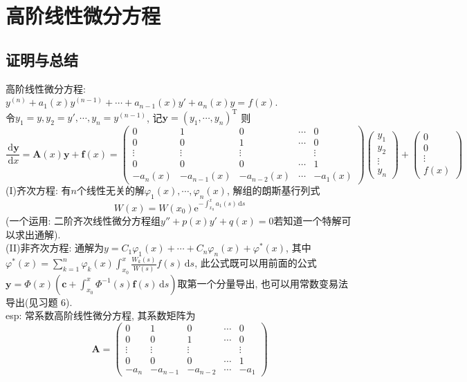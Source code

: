 \documentclass[titlepage,11pt,a4paper,twoside]{report}
\newcommand\diff{\,\mathrm{d}}
\newcommand\e{\mathrm{e}}
\newcommand\bmitPhi{\bm{\varPhi}}
\newcommand\T{\mathrm{T}}
\begin{document}
\section{高阶线性微分方程}
\subsection{证明与总结}
高阶线性微分方程: $y^{(n)}+a_1(x)y^{(n-1)}+\cdots+a_{n-1}(x)y'+a_n(x)y=f(x)$.\\
令$y_1=y,y_2=y',\cdots,y_n=y^{(n-1)}$, 记$\bm{y}=(y_1,\cdots,y_n)^{\T}$ 则
\[\frac{\diff\bm{y}}{\diff x}=\bm{A}(x)\bm{y}+\bm{f}(x)=\begin{pmatrix}0&1&0&\cdots&0\\0&0&1&\cdots&0\\
\vdots&\vdots&\vdots&&\vdots\\0&0&0&\cdots&1\\-a_n(x)&-a_{n-1}(x)&-a_{n-2}(x)&\cdots&-a_1(x)\end{pmatrix}\begin{pmatrix}y_1\\y_2\\\vdots\\y_n\end{pmatrix}+\begin{pmatrix}0\\0\\\vdots\\f(x)\end{pmatrix}\]
(I)齐次方程: 有$n$个线性无关的解$\varphi_1(x),\cdots,\varphi_n(x)$, 解组的朗斯基行列式
\[W(x)=W(x_0)\e^{-\int_{x_0}^xa_1(s)\diff s}\]
(一个运用: 二阶齐次线性微分方程组$y''+p(x)y'+q(x)=0$若知道一个特解可以求出通解).\\
(II)非齐次方程: 通解为$y=C_1\varphi_1(x)+\cdots+C_n\varphi_n(x)+\varphi^*(x)$, 其中$\displaystyle\varphi^*(x)=\sum_{k=1}^n\varphi_k(x)\int_{x_0}^x\frac{W_k(s)}{W(s)}f(s)\diff s$, 此公式既可以用前面的公式$\displaystyle\bm{y}=\bmitPhi(x)\left(\bm{c}+\int_{x_0}^x\bmitPhi^{-1}(s)\bm{f}(s)\diff s\right)$取第一个分量导出, 也可以用常数变易法导出(见习题 6).\\
esp: 常系数高阶线性微分方程, 其系数矩阵为
\[\bm{A}=\begin{pmatrix}0&1&0&\cdots&0\\0&0&1&\cdots&0\\
\vdots&\vdots&\vdots&&\vdots\\0&0&0&\cdots&1\\-a_n&-a_{n-1}&-a_{n-2}&\cdots&-a_1\end{pmatrix}\]
\end{document}
